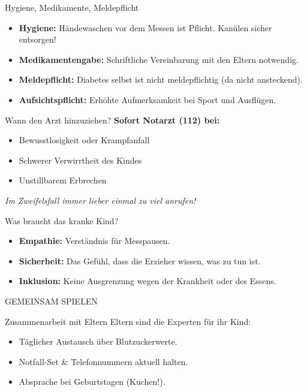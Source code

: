 \documentclass[10pt, aspectratio=169]{beamer}
\newcommand{\imagebox}[2]{%
	\begin{tcolorbox}[enhanced, colback=white, colframe=KitaBlue!20, arc=3mm, width=\textwidth, height=#1, valign=center, halign=center]
		\centering
		\vspace{0.5em}
		\scriptsize \color{KitaBlue!60} \MakeUppercase{#2}
	\end{tcolorbox}
}
\begin{document}
	\begin{frame}{Hygiene, Medikamente, Meldepflicht}
		\begin{itemize}
			\item \textbf{Hygiene:} Händewaschen vor dem Messen ist Pflicht. Kanülen sicher entsorgen!
			\item \textbf{Medikamentengabe:} Schriftliche Vereinbarung mit den Eltern notwendig.
			\item \textbf{Meldepflicht:} Diabetes selbst ist nicht meldepflichtig (da nicht ansteckend).
			\item \textbf{Aufsichtspflicht:} Erhöhte Aufmerksamkeit bei Sport und Ausflügen.
		\end{itemize}
	\end{frame}
	
	\begin{frame}{Wann den Arzt hinzuziehen?}
		\textbf{Sofort Notarzt (112) bei:}
		\begin{itemize}
			\item Bewusstlosigkeit oder Krampfanfall
			\item Schwerer Verwirrtheit des Kindes
			\item Unstillbarem Erbrechen
		\end{itemize}
		\vspace{0.5em}
		\emph{Im Zweifelsfall immer lieber einmal zu viel anrufen!}
	\end{frame}
	
	\begin{frame}{Was braucht das kranke Kind?}
		\begin{itemize}
			\item \textbf{Empathie:} Verständnis für Messpausen.
			\item \textbf{Sicherheit:} Das Gefühl, dass die Erzieher wissen, was zu tun ist.
			\item \textbf{Inklusion:} Keine Ausgrenzung wegen der Krankheit oder des Essens.
		\end{itemize}
		\imagebox{3cm}{Gemeinsam spielen}
	\end{frame}
	
	\begin{frame}{Zusammenarbeit mit Eltern}
		Eltern sind die Experten für ihr Kind:
		\begin{itemize}
			\item Täglicher Austausch über Blutzuckerwerte.
			\item Notfall-Set \& Telefonnummern aktuell halten.
			\item Absprache bei Geburtstagen (Kuchen!).
		\end{itemize}
	\end{frame}
	
\end{document}
